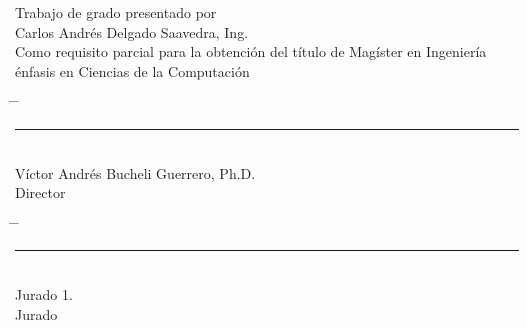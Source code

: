\vspace*{4cm}
\begin{center}
Trabajo de grado presentado por\\
Carlos Andrés Delgado Saavedra, Ing.\\
Como requisito parcial para la obtención del título de Magíster en Ingeniería énfasis en Ciencias de la Computación
\end{center}
\vfill
\begin{center}
\begin{tabbing}
\hspace{0.05\textwidth} \= \hspace{0.05\textwidth} \= \kill
\rule{70mm}{0.1mm} \>%
\\
Víctor Andrés Bucheli Guerrero, Ph.D.\> %
\\
Director \>%
\end{tabbing}
\end{center}
\vfill
\begin{center}
\begin{tabbing}
\hspace{0.05\textwidth} \= \hspace{0.05\textwidth} \= \kill
\rule{70mm}{0.1mm} \> \rightline{\rule{70mm}{0.1mm}} \\
Jurado 1. \> \\
Jurado \> 
\end{tabbing}
\end{center}
\vfill

